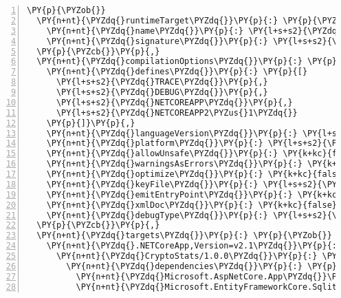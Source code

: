 \def\PYZbs{\char`\\}
\def\PYZus{\char`\_}
\def\PYZob{\char`\{}
\def\PYZcb{\char`\}}
\def\PYZca{\char`\^}
\def\PYZam{\char`\&}
\def\PYZlt{\char`\<}
\def\PYZgt{\char`\>}
\def\PYZsh{\char`\#}
\def\PYZpc{\char`\%}
\def\PYZdl{\char`\$}
\def\PYZhy{\char`\-}
\def\PYZsq{\char`\'}
\def\PYZdq{\char`\"}
\def\PYZti{\char`\~}
\def\PYZat{@}
\def\PYZlb{[}
\def\PYZrb{]}
\makeatother\begin{Verbatim}[commandchars=\\\{\},numbers=left,firstnumber=1,stepnumber=1,numberblanklines=0]
\PY{p}{\PYZob{}}
  \PY{n+nt}{\PYZdq{}runtimeTarget\PYZdq{}}\PY{p}{:} \PY{p}{\PYZob{}}
    \PY{n+nt}{\PYZdq{}name\PYZdq{}}\PY{p}{:} \PY{l+s+s2}{\PYZdq{}.NETCoreApp,Version=v2.1\PYZdq{}}\PY{p}{,}
    \PY{n+nt}{\PYZdq{}signature\PYZdq{}}\PY{p}{:} \PY{l+s+s2}{\PYZdq{}b38caabc7ac9ca231b3434f03b3a4cf84f4673ea\PYZdq{}}
  \PY{p}{\PYZcb{}}\PY{p}{,}
  \PY{n+nt}{\PYZdq{}compilationOptions\PYZdq{}}\PY{p}{:} \PY{p}{\PYZob{}}
    \PY{n+nt}{\PYZdq{}defines\PYZdq{}}\PY{p}{:} \PY{p}{[}
      \PY{l+s+s2}{\PYZdq{}TRACE\PYZdq{}}\PY{p}{,}
      \PY{l+s+s2}{\PYZdq{}DEBUG\PYZdq{}}\PY{p}{,}
      \PY{l+s+s2}{\PYZdq{}NETCOREAPP\PYZdq{}}\PY{p}{,}
      \PY{l+s+s2}{\PYZdq{}NETCOREAPP2\PYZus{}1\PYZdq{}}
    \PY{p}{]}\PY{p}{,}
    \PY{n+nt}{\PYZdq{}languageVersion\PYZdq{}}\PY{p}{:} \PY{l+s+s2}{\PYZdq{}\PYZdq{}}\PY{p}{,}
    \PY{n+nt}{\PYZdq{}platform\PYZdq{}}\PY{p}{:} \PY{l+s+s2}{\PYZdq{}\PYZdq{}}\PY{p}{,}
    \PY{n+nt}{\PYZdq{}allowUnsafe\PYZdq{}}\PY{p}{:} \PY{k+kc}{false}\PY{p}{,}
    \PY{n+nt}{\PYZdq{}warningsAsErrors\PYZdq{}}\PY{p}{:} \PY{k+kc}{false}\PY{p}{,}
    \PY{n+nt}{\PYZdq{}optimize\PYZdq{}}\PY{p}{:} \PY{k+kc}{false}\PY{p}{,}
    \PY{n+nt}{\PYZdq{}keyFile\PYZdq{}}\PY{p}{:} \PY{l+s+s2}{\PYZdq{}\PYZdq{}}\PY{p}{,}
    \PY{n+nt}{\PYZdq{}emitEntryPoint\PYZdq{}}\PY{p}{:} \PY{k+kc}{true}\PY{p}{,}
    \PY{n+nt}{\PYZdq{}xmlDoc\PYZdq{}}\PY{p}{:} \PY{k+kc}{false}\PY{p}{,}
    \PY{n+nt}{\PYZdq{}debugType\PYZdq{}}\PY{p}{:} \PY{l+s+s2}{\PYZdq{}portable\PYZdq{}}
  \PY{p}{\PYZcb{}}\PY{p}{,}
  \PY{n+nt}{\PYZdq{}targets\PYZdq{}}\PY{p}{:} \PY{p}{\PYZob{}}
    \PY{n+nt}{\PYZdq{}.NETCoreApp,Version=v2.1\PYZdq{}}\PY{p}{:} \PY{p}{\PYZob{}}
      \PY{n+nt}{\PYZdq{}CryptoStats/1.0.0\PYZdq{}}\PY{p}{:} \PY{p}{\PYZob{}}
        \PY{n+nt}{\PYZdq{}dependencies\PYZdq{}}\PY{p}{:} \PY{p}{\PYZob{}}
          \PY{n+nt}{\PYZdq{}Microsoft.AspNetCore.App\PYZdq{}}\PY{p}{:} \PY{l+s+s2}{\PYZdq{}2.1.0\PYZhy{}rc1\PYZhy{}final\PYZdq{}}\PY{p}{,}
          \PY{n+nt}{\PYZdq{}Microsoft.EntityFrameworkCore.Sqlite\PYZdq{}}\PY{p}{:} \PY{l+s+s2}{\PYZdq{}2.1.0\PYZhy{}rc1\PYZhy{}final\PYZdq{}}\PY{p}{,}

\end{Verbatim}
